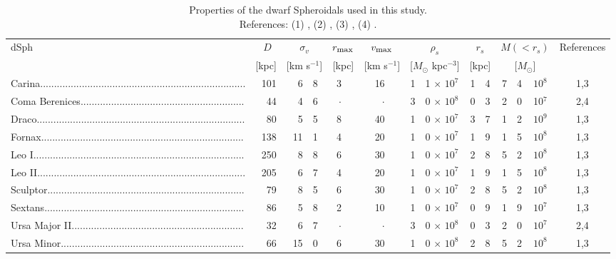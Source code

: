 \documentclass[aps,prd,twocolumn,amsmath,amssymb,floatfix,nofootinbib,10pt]{revtex4}
\newcommand{\sigv}{\ensuremath{\sigma_v}}
\newcommand{\rhos}{\ensuremath{\rho_s}}
\newcommand{\rs}{\ensuremath{r_s}}
\newcommand{\dist}{\ensuremath{D}}
\newcommand{\Msol}{\ensuremath{M_{\odot}}}
\newcommand{\Msun}{\Msol}
\newcommand{\vmax}{\ensuremath{v_{\mbox{{\footnotesize max}}}}}
\newcommand{\rmax}{\ensuremath{r_{\mbox{{\footnotesize max}}}}}
\begin{document}
\begingroup
\begin{table}
\begin{ruledtabular}
\begin{tabular}{lrr@{.}lr@{}lr@{}lr@{.}lr@{.}lr@{.}l@{ $\times$ }lc}
dSph & \dist\ & \multicolumn{2}{c}{\sigv}\ & \multicolumn{2}{c}{\rmax} & \multicolumn{2}{c}{\vmax} & \multicolumn{2}{c}{\rhos} & \multicolumn{2}{c}{\rs} & \multicolumn{3}{c}{$M(<\rs)$} & References\\
& [kpc] & \multicolumn{2}{c}{[km s$^{-1}$]} & \multicolumn{2}{c}{[kpc]} & \multicolumn{2}{c}{[km s$^{-1}$]} & \multicolumn{2}{c}{[$\Msun$ kpc$^{-3}$]} & \multicolumn{2}{c}{[kpc]} & \multicolumn{3}{c}{[$\Msun$]}&\\[4pt]
\hline
Carina.......................................................................... & 101 & 6&8 & 3&\phantom{f}      & 16&$\!\!\!$      & 1&1 $\times$ $10^7$ & 1&4 & 7&4&$10^8$ & 1,3\\
Coma Berenices...........................................................      & 44  & 4&6 & $\cdot$&& $\cdot$& & 3&0 $\times$ $10^8$ & 0&3 & 2&0&10$^7$ & 2,4\\
Draco........................................................................... & 80  & 5&5 & 8&      & 40&      & 1&0 $\times$ $10^7$ & 3&7 & 1&2&$10^9$ & 1,3\\
Fornax.........................................................................  & 138 & 11&1& 4&      & 20&      & 1&0 $\times$ $10^7$ & 1&9 & 1&5&$10^8$ & 1,3\\
Leo I............................................................................  & 250 & 8&8 & 6&      & 30&      & 1&0 $\times$ $10^7$ & 2&8 & 5&2&$10^8$ & 1,3\\
Leo II...........................................................................  & 205 & 6&7 & 4&      & 20&      & 1&0 $\times$ $10^7$ & 1&9 & 1&5&$10^8$ & 1,3\\
Sculptor.......................................................................  & 79  & 8&5 & 6&      & 30&      & 1&0 $\times$ $10^7$ & 2&8 & 5&2&$10^8$ & 1,3\\
Sextans........................................................................  & 86  & 5&8 & 2&      & 10&      & 1&0 $\times$ $10^7$ & 0&9 & 1&9&$10^7$ & 1,3\\
Ursa Major II..............................................................   & 32  & 6&7 & $\cdot$&& $\cdot$& & 3&0 $\times$ $10^8$ & 0&3 & 2&0&$10^7$ & 2,4\\
Ursa Minor..................................................................    & 66  & 15&0& 6&      & 30&      & 1&0 $\times$ $10^8$ & 2&8 & 5&2&$10^8$ & 1,3\\
\end{tabular}
\end{ruledtabular}
\caption{Properties of the dwarf Spheroidals used in this study.\\
References: (1) \citet{2008ApJ...672..904P}, (2) \citet{2008ApJ...678..614S}, (3) \citet{1998ARA&A..36..435M}, (4) \citet{2007ApJ...670..313S}.}\label{tab:dsphs}
\end{table}
\end{document}
